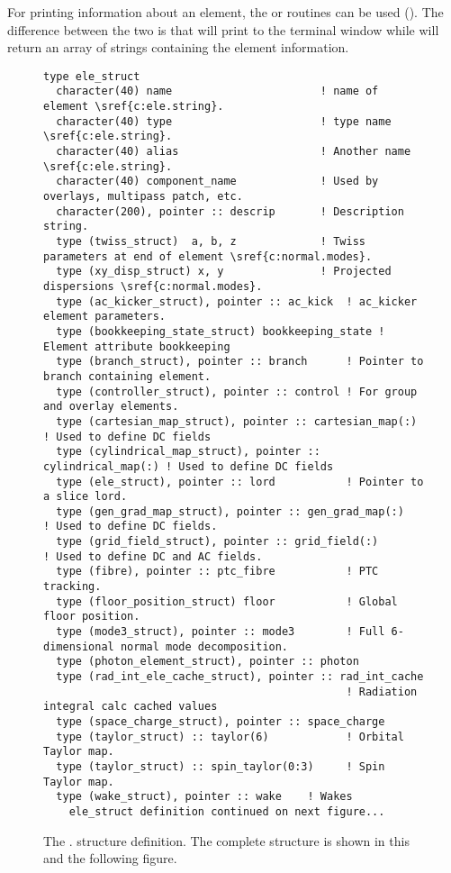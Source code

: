 For printing information about an element, the
 or  routines
can be used (). The difference between the two is
that  will print to the terminal window while 
will return an array of strings containing the element information.
\nopagebreak[4]
\begin{figure}[htb]
\centering
\footnotesize
\begin{verbatim}
type ele_struct
  character(40) name                       ! name of element \sref{c:ele.string}.
  character(40) type                       ! type name \sref{c:ele.string}.
  character(40) alias                      ! Another name \sref{c:ele.string}.
  character(40) component_name             ! Used by overlays, multipass patch, etc.
  character(200), pointer :: descrip       ! Description string.
  type (twiss_struct)  a, b, z             ! Twiss parameters at end of element \sref{c:normal.modes}.
  type (xy_disp_struct) x, y               ! Projected dispersions \sref{c:normal.modes}.
  type (ac_kicker_struct), pointer :: ac_kick  ! ac_kicker element parameters.
  type (bookkeeping_state_struct) bookkeeping_state ! Element attribute bookkeeping
  type (branch_struct), pointer :: branch      ! Pointer to branch containing element.
  type (controller_struct), pointer :: control ! For group and overlay elements. 
  type (cartesian_map_struct), pointer :: cartesian_map(:)     ! Used to define DC fields
  type (cylindrical_map_struct), pointer :: cylindrical_map(:) ! Used to define DC fields
  type (ele_struct), pointer :: lord           ! Pointer to a slice lord.
  type (gen_grad_map_struct), pointer :: gen_grad_map(:)       ! Used to define DC fields.
  type (grid_field_struct), pointer :: grid_field(:)           ! Used to define DC and AC fields.
  type (fibre), pointer :: ptc_fibre           ! PTC tracking.
  type (floor_position_struct) floor           ! Global floor position.
  type (mode3_struct), pointer :: mode3        ! Full 6-dimensional normal mode decomposition.
  type (photon_element_struct), pointer :: photon
  type (rad_int_ele_cache_struct), pointer :: rad_int_cache  
                                               ! Radiation integral calc cached values 
  type (space_charge_struct), pointer :: space_charge 
  type (taylor_struct) :: taylor(6)            ! Orbital Taylor map.
  type (taylor_struct) :: spin_taylor(0:3)     ! Spin Taylor map.
  type (wake_struct), pointer :: wake    ! Wakes
    ele_struct definition continued on next figure...
\end{verbatim}
\caption[The  (part 1).]{The . structure definition. 
The complete structure is shown in this and the following figure.}
\label{f:ele.struct1}
\end{figure}

